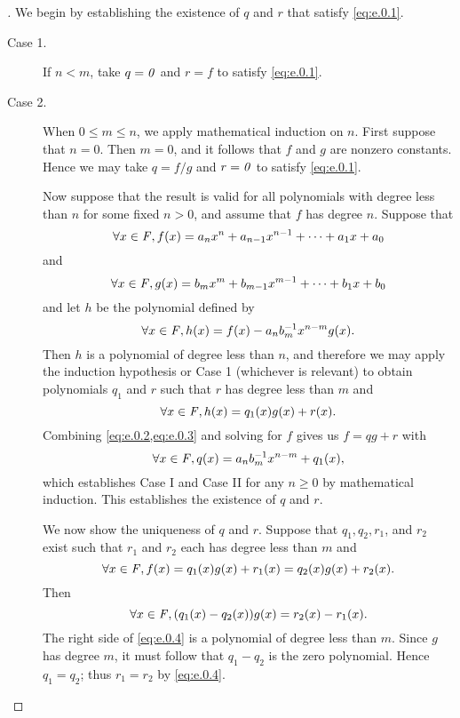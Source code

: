 \begin{proof}[]
	We begin by establishing the existence of \(q\) and \(r\) that satisfy \cref{eq:e.0.1}.
	\begin{description}
		\item[Case 1.]
			If \(n < m\), take \(q = \mathit{0}\) and \(r = f\) to satisfy \cref{eq:e.0.1}.
		\item[Case 2.]
			When \(0 \leq m \leq n\), we apply mathematical induction on \(n\).
			First suppose that \(n = 0\).
			Then \(m = 0\), and it follows that \(f\) and \(g\) are nonzero constants.
			Hence we may take \(q = f / g\) and \(r = \mathit{0}\) to satisfy \cref{eq:e.0.1}.

			Now suppose that the result is valid for all polynomials with degree less than \(n\) for some fixed \(n > 0\), and assume that \(f\) has degree \(n\).
			Suppose that
			\[
				\forall x \in \mathit{F}, f(x) = a_n x^n + a_{n - 1} x^{n - 1} + \cdots + a_1 x + a_0
			\]
			and
			\[
				\forall x \in \mathit{F}, g(x) = b_m x^m + b_{m - 1} x^{m - 1} + \cdots + b_1 x + b_0
			\]
			and let \(h\) be the polynomial defined by
			\begin{equation}\label{eq:e.0.2}
				\forall x \in \mathit{F}, h(x) = f(x) - a_n b_m^{-1} x^{n - m} g(x).
			\end{equation}
			Then \(h\) is a polynomial of degree less than \(n\), and therefore we may apply the induction hypothesis or Case 1 (whichever is relevant) to obtain polynomials \(q_1\) and \(r\) such that \(r\) has degree less than \(m\) and
			\begin{equation}\label{eq:e.0.3}
				\forall x \in \mathit{F}, h(x) = q_1(x) g(x) + r(x).
			\end{equation}
			Combining \cref{eq:e.0.2,eq:e.0.3} and solving for \(f\) gives us \(f = q g + r\) with
			\[
				\forall x \in \mathit{F}, q(x) = a_n b_m^{-1} x^{n - m} + q_1(x),
			\]
			which establishes Case I and Case II for any \(n \geq 0\) by mathematical induction.
			This establishes the existence of \(q\) and \(r\).

			We now show the uniqueness of \(q\) and \(r\).
			Suppose that \(q_1, q_2, r_1\), and \(r_2\) exist such that \(r_1\) and \(r_2\) each has degree less than \(m\) and
			\[
				\forall x \in \mathit{F}, f(x) = q_1(x) g(x) + r_1(x) = q_2(x) g(x) + r_2(x).
			\]
			Then
			\begin{equation}\label{eq:e.0.4}
				\forall x \in \mathit{F}, (q_1(x) - q_2(x)) g(x) = r_2(x) - r_1(x).
			\end{equation}
			The right side of \cref{eq:e.0.4} is a polynomial of degree less than \(m\).
			Since \(g\) has degree \(m\), it must follow that \(q_1 - q_2\) is the zero polynomial.
			Hence \(q_1 = q_2\);
			thus \(r_1 = r_2\) by \cref{eq:e.0.4}.
	\end{description}
\end{proof}

